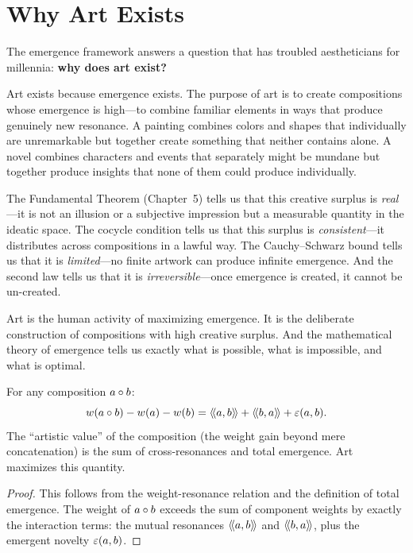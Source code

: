 \section{Why Art Exists}

The emergence framework answers a question that has troubled aestheticians for
millennia: \textbf{why does art exist?}

Art exists because emergence exists. The purpose of art is to create compositions
whose emergence is high---to combine familiar elements in ways that produce
genuinely new resonance. A painting combines colors and shapes that individually
are unremarkable but together create something that neither contains alone.
A novel combines characters and events that separately might be mundane but
together produce insights that none of them could produce individually.

The Fundamental Theorem (Chapter~5) tells us that this creative surplus is
\emph{real}---it is not an illusion or a subjective impression but a measurable
quantity in the ideatic space. The cocycle condition tells us that this surplus
is \emph{consistent}---it distributes across compositions in a lawful way. The
Cauchy--Schwarz bound tells us that it is \emph{limited}---no finite artwork
can produce infinite emergence. And the second law tells us that it is
\emph{irreversible}---once emergence is created, it cannot be un-created.

Art is the human activity of maximizing emergence. It is the deliberate
construction of compositions with high creative surplus. And the mathematical
theory of emergence tells us exactly what is possible, what is impossible, and
what is optimal.

\begin{theorem}
\label{thm:enrichment-art}
For any composition $a \circ b$:
\[
  w(a \circ b) - w(a) - w(b) = \langle\!\langle a, b \rangle\!\rangle + \langle\!\langle b, a \rangle\!\rangle + \varepsilon(a,b).
\]
The ``artistic value'' of the composition (the weight gain beyond mere
concatenation) is the sum of cross-resonances and total emergence. Art maximizes
this quantity.
\end{theorem}

\begin{proof}
This follows from the weight-resonance relation and the definition of total
emergence. The weight of $a \circ b$ exceeds the sum of component weights
by exactly the interaction terms: the mutual resonances $\langle\!\langle a, b \rangle\!\rangle$ and
$\langle\!\langle b, a \rangle\!\rangle$, plus the emergent novelty $\varepsilon(a,b)$.
\end{proof}

